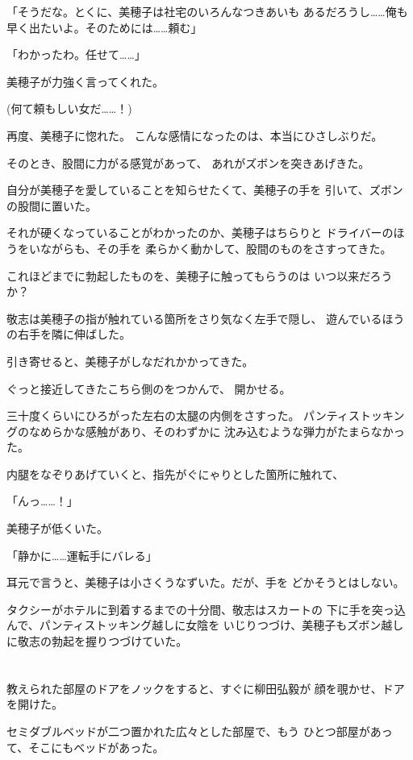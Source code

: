 ﻿\documentclass[
    book,tate,
    line_length=30zw,
    jafontsize=12pt,
    paper=b5j,
    landscape,
    ]{jlreq}
\begin{document}
「そうだな。とくに、美穂子は社宅のいろんなつきあいも
あるだろうし……俺も早く出たいよ。そのためには……頼む」

「わかったわ。任せて……」

美穂子が力強く言ってくれた。

(何て頼もしい女だ……！)

再度、美穂子に惚れた。 こんな感情になったのは、本当にひさしぶりだ。

そのとき、股間に力がる感覚があって、
あれがズボンを突きあげきた。

自分が美穂子を愛していることを知らせたくて、美穂子の手を
引いて、ズボンの股間に置いた。

それが硬くなっていることがわかったのか、美穂子はちらりと
ドライバーのほうをいながらも、その手を
柔らかく動かして、股間のものをさすってきた。

これほどまでに勃起したものを、美穂子に触ってもらうのは
いつ以来だろうか？

敬志は美穂子の指が触れている箇所をさり気なく左手で隠し、
遊んでいるほうの右手を隣に伸ばした。

引き寄せると、美穂子がしなだれかかってきた。

ぐっと接近してきたこちら側のをつかんで、
開かせる。

三十度くらいにひろがった左右の太腿の内側をさすった。
パンティストッキングのなめらかな感触があり、そのわずかに
沈み込むような弾力がたまらなかった。

内腿をなぞりあげていくと、指先がぐにゃりとした箇所に触れて、

「んっ……！」

美穂子が低くいた。

「静かに……運転手にバレる」

耳元で言うと、美穂子は小さくうなずいた。だが、手を
どかそうとはしない。

タクシーがホテルに到着するまでの十分間、敬志はスカートの
下に手を突っ込んで、パンティストッキング越しに女陰を
いじりつづけ、美穂子もズボン越しに敬志の勃起を握りつづけていた。

\section*{}

教えられた部屋のドアをノックをすると、すぐに柳田弘毅が
顔を覗かせ、ドアを開けた。

セミダブルベッドが二つ置かれた広々とした部屋で、もう
ひとつ部屋があって、そこにもベッドがあった。
\end{document}
